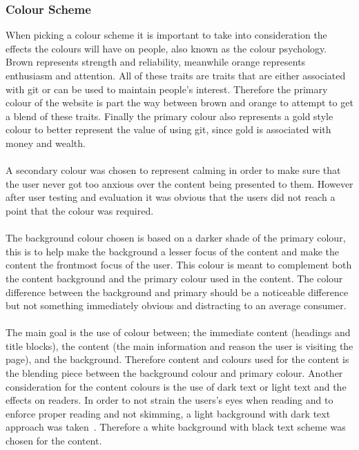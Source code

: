 \subsubsection{Colour Scheme}\label{sec:color}
When picking a colour scheme it is important to take into consideration the effects the colours will have on people, also known as the colour psychology. Brown represents strength and reliability, meanwhile orange represents enthusiasm and attention. All of these traits are traits that are either associated with \gls{git} or can be used to maintain people's interest. Therefore the primary colour of the website is part the way between brown and orange to attempt to get a blend of these traits. Finally the primary colour also represents a gold style colour to better represent the value of using \gls{git}, since gold is associated with money and wealth.~\cite{colors}\\\\
A secondary colour was chosen to represent calming in order to make sure that the user never got too anxious over the content being presented to them. However after user testing and evaluation it was obvious that the users did not reach a point that the colour was required.~\cite{colors}\\\\
The background colour chosen is based on a darker shade of the primary colour, this is to help make the background a lesser focus of the content and make the content the frontmost focus of the user. This colour is meant to complement both the content background and the primary colour used in the content. The colour difference between the background and primary should be a noticeable difference but not something immediately obvious and distracting to an average consumer.\\\\
The main goal is the use of colour between; the immediate content (headings and title blocks), the content (the main information and reason the user is visiting the page), and the background. Therefore content and colours used for the content is the blending piece between the background colour and primary colour. Another consideration for the content colours is the use of dark text or light text and the effects on readers. In order to not strain the users's eyes when reading and to enforce proper reading and not skimming, a light background with dark text approach was taken~\cite{text}. Therefore a white background with black text scheme was chosen for the content.\\\\
